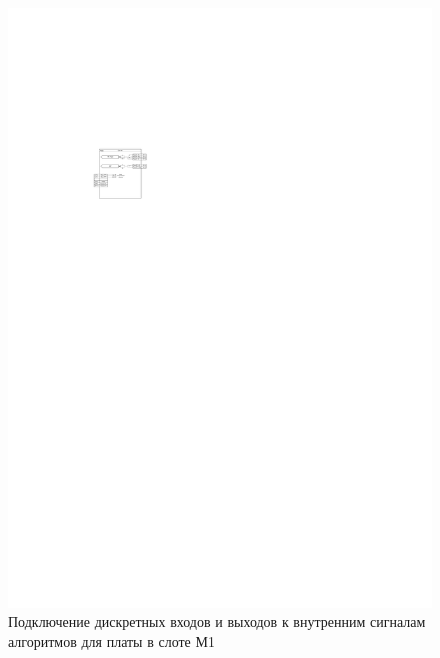 \documentclass[a4paper, 12pt,table, hidelinks, DIV=calc]{extarticle} %
\begin{document}
\begin{appendices}
\begin{landscape}
\begin{figure}[h!]
  \centering
  \hspace*{-1cm} %
  \includegraphics[width=1.5\textwidth]{img48.pdf}
  \caption{Подключение дискретных входов и выходов к внутренним сигналам алгоритмов для платы в слоте М1}
  \label{fig:sig21} %
\end{figure}


\end{landscape}
\end{appendices}
\end{document}

